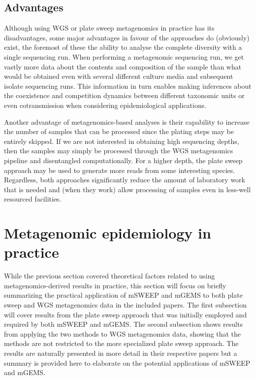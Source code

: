 \documentclass[officiallayout]{tktla}
\begin{document}
\subsection{Advantages}

Although using WGS or plate sweep metagenomics in practice has its
disadvantages, some major advantages in favour of the approaches do
(obviously) exist, the foremost of these the ability to analyse the
complete diversity with a single sequencing run. When performing a
metagenomic sequencing run, we get vastly more data about the contents
and composition of the sample than what would be obtained even with
several different culture media and subsequent isolate sequencing
runs. This information in turn enables making inferences about the
coexistence and competition dynamics between different taxonomic units
or even cotransmission when considering epidemiological applications.

Another advantage of metagenomics-based analyses is their capability
to increase the number of samples that can be processed since the
plating steps may be entirely skipped. If we are not interested in
obtaining high sequencing depths, then the samples may simply be
processed through the WGS metagenomics pipeline and disentangled
computationally. For a higher depth, the plate sweep approach may be
used to generate more reads from some interesting species. Regardless,
both approaches significantly reduce the amount of laboratory work
that is needed and (when they work) allow processing of samples even
in less-well resourced facilities.

\section{Metagenomic epidemiology in practice}

While the previous section covered theoretical factors related to
using metagenomics-derived results in practice, this section will
focus on briefly summarizing the practical application of mSWEEP and
mGEMS to both plate sweep and WGS metagenomics data in the included
papers. The first subsection will cover results from the plate sweep
approach that was initially employed and required by both mSWEEP and
mGEMS. The second subsection shows results from applying the two
methods to WGS metagenomics data, showing that the methods are not
restricted to the more specialized plate sweep approach. The results
are naturally presented in more detail in their respective papers but
a summary is provided here to elaborate on the potential applications
of mSWEEP and mGEMS.
\end{document}
